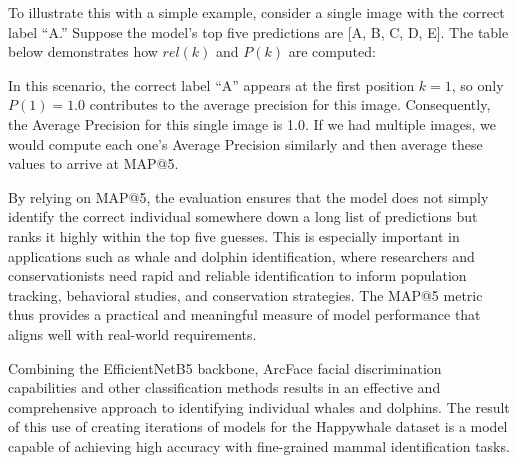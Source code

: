 \documentclass[twocolumn]{article}
\begin{document}
To illustrate this with a simple example, consider a single image with the correct label “A.” Suppose the model’s top five predictions are [A, B, C, D, E]. The table below demonstrates how \( rel(k) \) and \( P(k) \) are computed:

\begin{table}[ht!]
\centering
\renewcommand{\arraystretch}{1.5} %
\caption{Example computation of \( rel(k) \) and \( P(k) \) for an image with the correct label “A.” The first prediction is correct, so \( rel(k) \) is 1 for \( k = 1 \), and subsequent predictions contribute 0.}
\label{tab:map5_example}
\end{table}

In this scenario, the correct label “A” appears at the first position \( k=1 \), so only \( P(1) = 1.0 \) contributes to the average precision for this image. Consequently, the Average Precision for this single image is 1.0. If we had multiple images, we would compute each one’s Average Precision similarly and then average these values to arrive at MAP@5.

By relying on MAP@5, the evaluation ensures that the model does not simply identify the correct individual somewhere down a long list of predictions but ranks it highly within the top five guesses. This is especially important in applications such as whale and dolphin identification, where researchers and conservationists need rapid and reliable identification to inform population tracking, behavioral studies, and conservation strategies. The MAP@5 metric thus provides a practical and meaningful measure of model performance that aligns well with real-world requirements.

Combining the EfficientNetB5 backbone, ArcFace facial discrimination capabilities and other classification methods results in an effective and comprehensive approach to identifying individual whales and dolphins. The result of this use of creating iterations of models for the Happywhale dataset is a model capable of achieving high accuracy with fine-grained mammal identification tasks.
\end{document}
